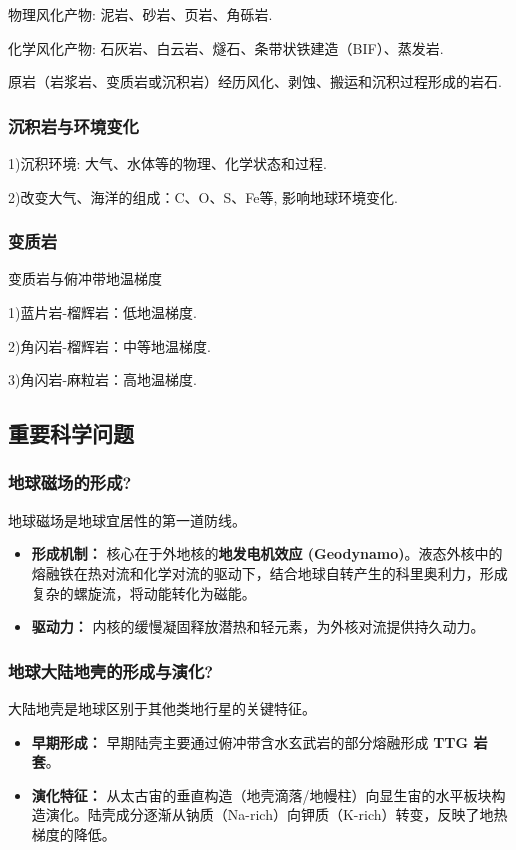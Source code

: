 \documentclass[12pt,a4paper]{article}
\begin{document}
	物理风化产物: 泥岩、砂岩、页岩、角砾岩.
	
	化学风化产物: 石灰岩、白云岩、燧石、条带状铁建造（BIF）、蒸发岩.
	
	原岩（岩浆岩、变质岩或沉积岩）经历风化、剥蚀、搬运和沉积过程形成的岩石.
	
	\subsubsection{沉积岩与环境变化}
	1)沉积环境: 大气、水体等的物理、化学状态和过程.
	
	2)改变大气、海洋的组成：C、O、S、Fe等, 影响地球环境变化.
	\subsubsection{变质岩}
	变质岩与俯冲带地温梯度
	
	1)蓝片岩-榴辉岩：低地温梯度.
	
	2)角闪岩-榴辉岩：中等地温梯度.
	
	3)角闪岩-麻粒岩：高地温梯度.
	
	\subsection{重要科学问题}
	
	\subsubsection{地球磁场的形成?}
	地球磁场是地球宜居性的第一道防线。
	\begin{itemize}
		\item \textbf{形成机制：} 核心在于外地核的\textbf{地发电机效应 (Geodynamo)}。液态外核中的熔融铁在热对流和化学对流的驱动下，结合地球自转产生的科里奥利力，形成复杂的螺旋流，将动能转化为磁能。
		\item \textbf{驱动力：} 内核的缓慢凝固释放潜热和轻元素，为外核对流提供持久动力。
	\end{itemize}
	
	\subsubsection{地球大陆地壳的形成与演化?}
	大陆地壳是地球区别于其他类地行星的关键特征。
	\begin{itemize}
		\item \textbf{早期形成：} 早期陆壳主要通过俯冲带含水玄武岩的部分熔融形成 \textbf{TTG 岩套}。
		\item \textbf{演化特征：} 从太古宙的垂直构造（地壳滴落/地幔柱）向显生宙的水平板块构造演化。陆壳成分逐渐从钠质（Na-rich）向钾质（K-rich）转变，反映了地热梯度的降低。
	\end{itemize}
	
\end{document}
